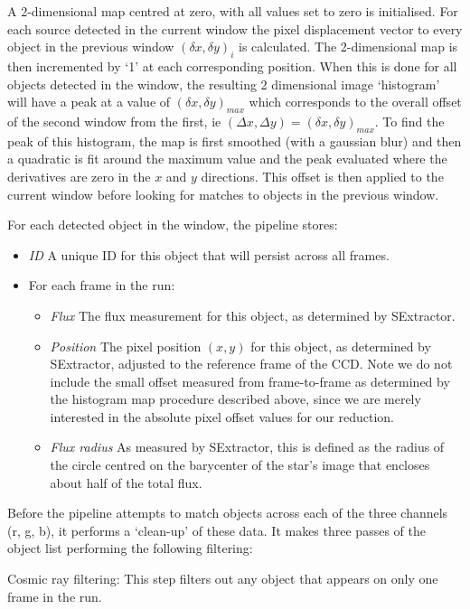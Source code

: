 A 2-dimensional map centred at zero, with all values set to zero is initialised. For each source detected in the current window the pixel displacement vector to every object in the previous window $(\delta x, \delta y)_i$ is calculated.  The 2-dimensional map is then incremented by `1' at each corresponding position. When this is done for all objects detected in the window, the resulting 2 dimensional image `histogram' will have a peak at a value of $(\delta x, \delta y)_{max}$ which corresponds to the overall offset of the second window from the first, ie $(\Delta x, \Delta y) = (\delta x, \delta y)_{max}$. To find the peak of this histogram, the map is first smoothed (with a gaussian blur) and then a quadratic is fit around the maximum value and the peak evaluated where the derivatives are zero in the $x$ and $y$ directions. This offset is then applied to the current window before looking for matches to objects in the previous window.

For each detected object in the window, the pipeline stores: 
\begin{itemize}
  \item \emph{ID} A unique ID for this object that will persist across all frames.
  \item For each frame in the run:
  \begin{itemize}
    \item \emph{Flux} The flux measurement for this object, as determined by SExtractor.
    \item \emph{Position} The pixel position $(x, y)$ for this object, as determined by SExtractor, adjusted to the reference frame of the CCD. Note we do not include the small offset measured from frame-to-frame as determined by the histogram map procedure described above, since we are merely interested in the absolute pixel offset values for our reduction. 
    \item \emph{Flux radius} As measured by SExtractor, this is defined as the radius of the circle centred on the barycenter of the star's image that encloses about half of the total flux. 
  \end{itemize}
\end{itemize}

\label{sect:filtering}
Before the pipeline attempts to match objects across each of the three channels (r, g, b), it performs a `clean-up' of these data. It makes three passes of the object list performing the following filtering:

Cosmic ray filtering: This step filters out any object that appears on only one frame in the run. 

